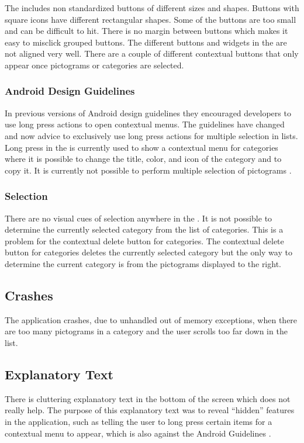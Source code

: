 The \ct includes non standardized buttons of different sizes and shapes. Buttons with square icons have different rectangular shapes. Some of the buttons are too small and can be difficult to hit. There is no margin between buttons which makes it easy to misclick grouped buttons. The different buttons and widgets in the \ct are not aligned very well. There are a couple of different contextual buttons that only appear once pictograms or categories are selected. 

\subsubsection{Android Design Guidelines}

In previous versions of Android design guidelines they encouraged developers to use long press actions to open contextual menus. The guidelines have changed and now advice to exclusively use long press actions for multiple selection in lists. Long press in the \ct is currently used to show a contextual menu for categories where it is possible to change the title, color, and icon of the category and to copy it. It is currently not possible to perform multiple selection of pictograms \parencite{android_guidelines_longpress}.

\subsubsection{Selection}


There are no visual cues of selection anywhere in the \ct. It is not possible to determine the currently selected category from the list of categories. This is a problem for the contextual delete button for categories. The contextual delete button for categories deletes the currently selected category but the only way to determine the current category is from the pictograms displayed to the right.

\subsection{Crashes}

The application crashes, due to unhandled out of memory exceptions, when there are too many pictograms in a category and the user scrolls too far down in the list. 


\subsection{Explanatory Text}

There is cluttering explanatory text in the bottom of the screen which does not really help. The purpose of this explanatory text was to reveal ``hidden'' features in the application, such as telling the user to long press certain items for a contextual menu to appear, which is also against the Android Guidelines \parencite{android_guidelines_longpress}.
